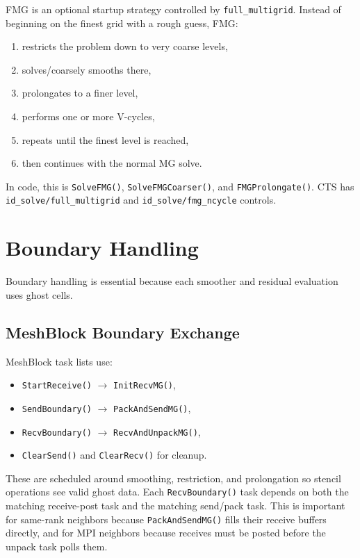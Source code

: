 \documentclass[11pt]{article}
\newcommand{\code}[1]{\texttt{#1}}
\begin{document}
FMG is an optional startup strategy controlled by \code{full\_multigrid}.  Instead
of beginning on the finest grid with a rough guess, FMG:
\begin{enumerate}
  \item restricts the problem down to very coarse levels,
  \item solves/coarsely smooths there,
  \item prolongates to a finer level,
  \item performs one or more V-cycles,
  \item repeats until the finest level is reached,
  \item then continues with the normal MG solve.
\end{enumerate}

In code, this is \code{SolveFMG()}, \code{SolveFMGCoarser()}, and
\code{FMGProlongate()}.  CTS has \code{id\_solve/full\_multigrid} and
\code{id\_solve/fmg\_ncycle} controls.

\section{Boundary Handling}

Boundary handling is essential because each smoother and residual evaluation
uses ghost cells.

\subsection{MeshBlock Boundary Exchange}

MeshBlock task lists use:
\begin{itemize}
  \item \code{StartReceive()} \(\to\) \code{InitRecvMG()},
  \item \code{SendBoundary()} \(\to\) \code{PackAndSendMG()},
  \item \code{RecvBoundary()} \(\to\) \code{RecvAndUnpackMG()},
  \item \code{ClearSend()} and \code{ClearRecv()} for cleanup.
\end{itemize}

These are scheduled around smoothing, restriction, and prolongation so stencil
operations see valid ghost data.  Each \code{RecvBoundary()} task depends on
both the matching receive-post task and the matching send/pack task.  This is
important for same-rank neighbors because \code{PackAndSendMG()} fills their
receive buffers directly, and for MPI neighbors because receives must be posted
before the unpack task polls them.
\end{document}

